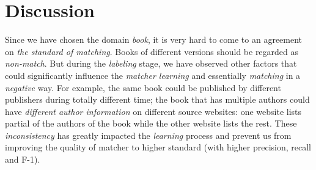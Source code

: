 \documentclass[10pt, oneside]{article}
\begin{document}
\section*{Discussion}
Since we have chosen the domain \textit{book}, it is very hard to come to an agreement on \textit{the standard of matching}. Books of different versions should be regarded as \textit{non-match}. But during the \textit{labeling}
stage, we have observed other factors that could significantly influence the \textit{matcher learning} and essentially \textit{matching} in a \textit{negative} way. For example, the same book could be published by different publishers
during totally different time; the book that has multiple authors could have \textit{different author information} on different source websites: one website lists partial of the authors of the book while the other website lists the rest.
These \textit{inconsistency} has greatly impacted the \textit{learning} process and prevent us from improving the quality of matcher to higher standard (with higher precision, recall and F-1).
\end{document}
